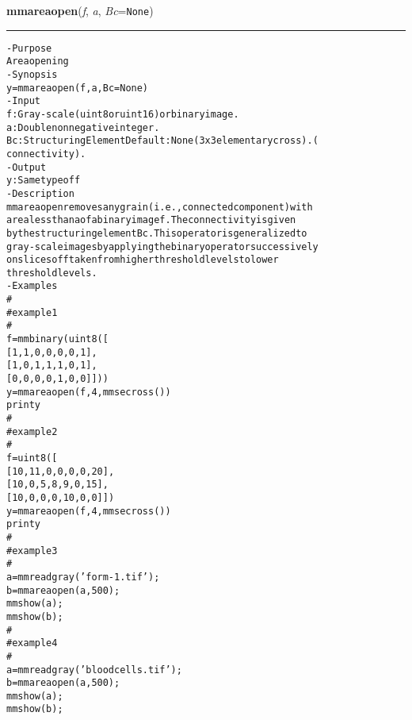     \begin{boxedminipage}{\textwidth}

    \raggedright \textbf{mmareaopen}(\textit{f}, \textit{a}, \textit{Bc}=\texttt{N\-o\-n\-e\-})

    \vspace{-1.5ex}

    \rule{\textwidth}{0.5\fboxrule}
\begin{alltt}
- Purpose
    Area opening
- Synopsis
    y = mmareaopen(f, a, Bc=None)
- Input
    f:  Gray-scale (uint8 or uint16) or binary image.
    a:  Double non negative integer.
    Bc: Structuring Element Default: None (3x3 elementary cross). (
        connectivity).
- Output
    y: Same type of f
- Description
    mmareaopen removes any grain (i.e., connected component) with
    area less than a of a binary image f . The connectivity is given
    by the structuring element Bc . This operator is generalized to
    gray-scale images by applying the binary operator successively
    on slices of f taken from higher threshold levels to lower
    threshold levels.
- Examples
    \#
    \#   example 1
    \#
    f=mmbinary(uint8([
     [1, 1, 0, 0, 0, 0, 1],
     [1, 0, 1, 1, 1, 0, 1],
     [0, 0, 0, 0, 1, 0, 0]]))
    y=mmareaopen(f,4,mmsecross())
    print y
    \#
    \#   example 2
    \#
    f=uint8([
       [10,   11,   0,    0,   0,   0,  20],
       [10,    0,   5,    8,   9,   0,  15],
       [10,    0,   0,    0,  10,   0,   0]])
    y=mmareaopen(f,4,mmsecross())
    print y
    \#
    \#   example 3
    \#
    a=mmreadgray('form-1.tif');
    b=mmareaopen(a,500);
    mmshow(a);
    mmshow(b);
    \#
    \#   example 4
    \#
    a=mmreadgray('bloodcells.tif');
    b=mmareaopen(a,500);
    mmshow(a);
    mmshow(b);\end{alltt}

    \vspace{1ex}

    \end{boxedminipage}

    \label{multireg:num_pymorph:mmasf}
    \vspace{0.5ex}

